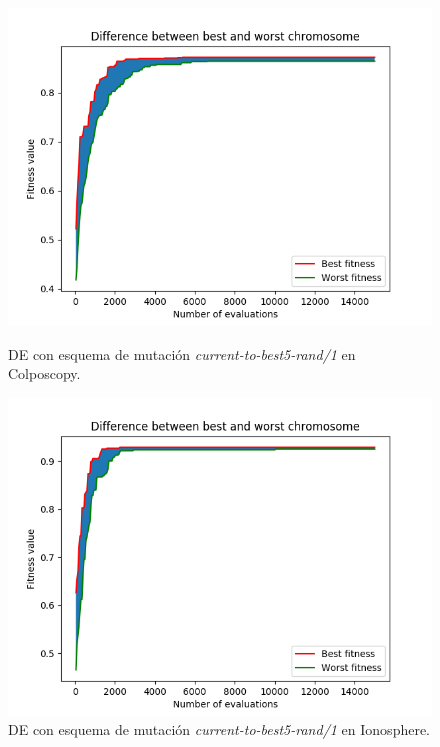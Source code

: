 \documentclass[11pt,a4paper]{article}
\begin{document}
\begin{figure}[H]
\centering
\begin{minipage}{.5\textwidth}
	\centering
	\includegraphics[scale=0.4]{img/colposcopy-de-randbest.png}
	\caption{DE con esquema de mutación \textit{current-to-best5-rand/1} en Colposcopy.}
\end{minipage}%
\begin{minipage}{.5\textwidth}
	\centering
	\includegraphics[scale=0.4]{img/ionosphere-de-randbest.png}
	\caption{DE con esquema de mutación \textit{current-to-best5-rand/1} en Ionosphere.}
\end{minipage}
\end{figure}
\end{document}
